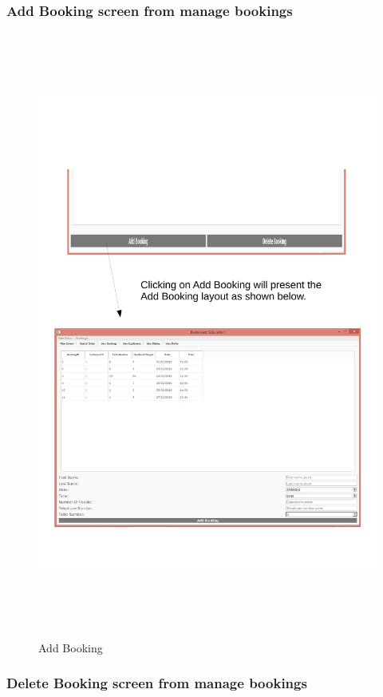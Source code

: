 \subsubsection{Add Booking screen from manage bookings}

\begin{figure}[H]
    \includegraphics[height = 20cm]{./Testing/images/test2.pdf}
    \caption{Add Booking} \label{fig:Test2}
\end{figure}

\subsubsection{Delete Booking screen from manage bookings}

